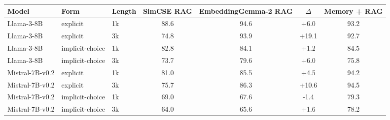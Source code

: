 \begin{tabular}{lll|cc|c|c}
\toprule
Model & Form & Length & SimCSE RAG & EmbeddingGemma-2 RAG & $\Delta$ & Memory + RAG \\
\midrule
Llama-3-8B & explicit & 1k & 88.6 & 94.6 & +6.0 & 93.2 \\
Llama-3-8B & explicit & 3k & 74.8 & 93.9 & +19.1 & 92.7 \\
Llama-3-8B & implicit-choice & 1k & 82.8 & 84.1 & +1.2 & 84.5 \\
Llama-3-8B & implicit-choice & 3k & 73.7 & 79.6 & +6.0 & 75.8 \\
Mistral-7B-v0.2 & explicit & 1k & 81.0 & 85.5 & +4.5 & 94.2 \\
Mistral-7B-v0.2 & explicit & 3k & 75.7 & 86.3 & +10.6 & 94.5 \\
Mistral-7B-v0.2 & implicit-choice & 1k & 69.0 & 67.6 & -1.4 & 79.3 \\
Mistral-7B-v0.2 & implicit-choice & 3k & 64.0 & 65.6 & +1.6 & 78.2 \\
\bottomrule
\end{tabular}
